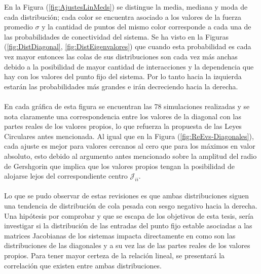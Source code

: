 En la Figura (\ref{fig:AjustesLinMeds}) se distingue la media, mediana y moda de cada distribución; cada color se encuentra asociado a los valores de la fuerza promedio $\sigma$ y la cantidad de puntos del mismo color corresponde a cada una de las probabilidades de conectividad del sistema. Se ha visto en la Figuras (\ref{fig:DistDiagonal}, \ref{fig:DistEigenvalores}) que cuando esta probabilidad es cada vez mayor entonces las colas de sus distribuciones son cada vez más anchas debido a la posibilidad de mayor cantidad de interacciones y la dependencia que hay con los valores del punto fijo del sistema. Por lo tanto hacia la izquierda estarán las probabilidades más grandes e irán decreciendo hacia la derecha.\\
\\
En cada gráfica de esta figura se encuentran las 78 simulaciones realizadas y se nota claramente una correspondencia entre los valores de la diagonal con las partes reales de los valores propios, lo que refuerza la propuesta de las Leyes Circulares antes mencionada. Al igual que en la Figura (\ref{fig:ReEvs-Diagonales}), cada ajuste es mejor para valores cercanos al cero que para los máximos en valor absoluto, esto debido al argumento antes mencionado sobre la amplitud del radio de Gershgorin que implica que los valores propios tengan la posibilidad de alojarse lejos del correspondiente centro $\mathcal{J}_{ii}$.\\
\\
Lo que se pudo observar de estas revisiones es que ambas distribuciones siguen una tendencia de distribución de cola pesada con sesgo negativo hacia la derecha. Una hipótesis por comprobar y que se escapa de los objetivos de esta tesis, sería investigar si la distribución de las entradas del punto fijo estable asociadas a las matrices Jacobianas de los sistemas impacta directamente en como son las distribuciones de las diagonales y a su vez las de las partes reales de los valores propios. Para tener mayor certeza de la relación lineal, se presentará la correlación que existen entre ambas distribuciones.	
